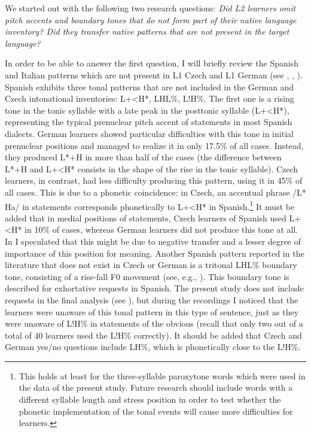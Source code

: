 We started out with the following two research questions: \textit{Did L2 learners omit pitch accents and boundary tones that do not form part of their native language inventory? Did they transfer native patterns that are not present in the target language?}


In order to be able to answer the first question, I will briefly review the Spanish and Italian patterns which are not present in L1 Czech and L1 German (see , , ). Spanish exhibits three tonal patterns that are not included in the German and Czech intonational inventories: L+<H*, LHL\%, L!H\%. The first one is a rising tone in the tonic syllable with a late peak in the posttonic syllable (L+<H*), representing the typical prenuclear pitch accent of statements in most Spanish dialects. German learners showed particular difficulties with this tone in initial prenuclear positions and managed to realize it in only 17.5\% of all cases. Instead, they produced L*+H in more than half of the cases (the difference between L*+H and L+<H* consists in the shape of the rise in the tonic syllable). Czech learners, in contrast, had less difficulty producing this pattern, using it in 45\% of all cases. This is due to a phonetic coincidence: in Czech, an accentual phrase /L* Ha/ in statements corresponds phonetically to L+<H* in Spanish.\footnote{This holds at least for the three-syllable paroxytone words which were used in the data of the present study. Future research should include words with a different syllable length and stress position in order to test whether the phonetic implementation of the tonal events will cause more difficulties for learners.}  It must be added that in medial positions of statements, Czech learners of Spanish used L+<H* in 10\% of cases, whereas German learners did not produce this tone at all. In  I speculated that this might be due to negative transfer and a lesser degree of importance of this position for meaning. Another Spanish pattern reported in the literature that does not exist in Czech or German is a tritonal LHL\% boundary tone, consisting of a rise-fall F0 movement (see, e.g., \citealt{AguilarEtAl2009}). This boundary tone is described for exhortative requests in Spanish. The present study does not include requests in the final analysis (see ), but during the recordings I noticed that the learners were unaware of this tonal pattern in this type of sentence, just as they were unaware of L!H\% in statements of the obvious (recall that only two out of a total of 40 learners used the L!H\% correctly). It should be added that Czech and German yes/no questions include LH\%, which is phonetically close to the L!H\%.



